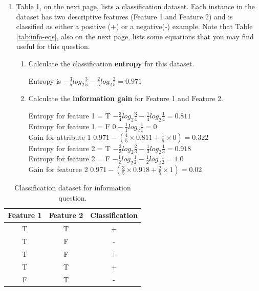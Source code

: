 \documentclass[--SOLUTION-OPTION--]{ditpaper}
\begin{document}
\begin{enumerate}
		\item Table \ref{tab:classification-data}, on the next page, lists a classification dataset. Each instance in the dataset has two descriptive features (Feature 1 and Feature 2) and is classified as either a positive (+) or a negative(-) example. Note that Table \ref{tab:info-eqs}, also on the next page, lists some equations that you may find useful for this question.		
				\begin{enumerate}
			\item Calculate the classification \textbf{entropy} for this dataset.
			\begin{answer}
				Entropy is $-\frac{3}{5}log_2\frac{3}{5}-\frac{2}{5}log_2\frac{2}{5}=0.971$
			\end{answer}
			\item Calculate the \textbf{information gain} for Feature 1 and Feature 2.
			\begin{answer}
				Entropy for feature 1 = T $-\frac{3}{4}log_2\frac{3}{4}-\frac{1}{4}log_2\frac{1}{4}=0.811$\\
				Entropy for feature 1 = F $0-\frac{1}{1}log_2\frac{1}{1}=0$\\
				Gain for attribute 1 $0.971-(\frac{4}{5}\times0.811+\frac{1}{5}\times0)=0.322$\\
				Entropy for feature 2 = T $-\frac{2}{3}log_2\frac{2}{3}-\frac{1}{3}log_2\frac{1}{3}=0.918$\\
				Entropy for feature 2 = F $-\frac{1}{2}log_2\frac{1}{2}-\frac{1}{2}log_2\frac{1}{2}=1.0$\\
				Gain for featuree 2 $0.971-(\frac{3}{5}\times0.918+\frac{2}{5}\times1)=0.02$\\
			\end{answer}
		\end{enumerate}
	\end{enumerate}

\newpage

			\begin{table}[htb]
			\begin{center}
			\begin{tabular}{|c|c|c|}
				Feature 1 & Feature 2 & Classification \\
				\hline
				T & T & + \\
				T & F & - \\
				T & F & + \\
				T & T & + \\
				F & T & - \\
			\end{tabular}
			\end{center}
			\caption{Classification dataset for information question.}
			\label{tab:classification-data}
		\end{table}
\end{document}
